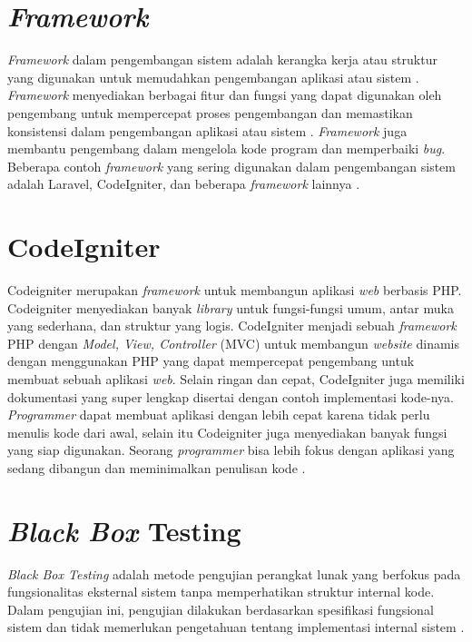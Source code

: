 \section{\textit{Framework}}
\textit{Framework} dalam pengembangan sistem adalah kerangka kerja atau struktur yang digunakan untuk memudahkan pengembangan aplikasi atau sistem \cite{sallaby2020perancangan}. \textit{Framework} menyediakan berbagai fitur dan fungsi yang dapat digunakan oleh pengembang untuk mempercepat proses pengembangan dan memastikan konsistensi dalam pengembangan aplikasi atau sistem \cite{simanullang2021sistem}. \textit{Framework} juga membantu pengembang dalam mengelola kode program dan memperbaiki \textit{bug}. Beberapa contoh \textit{framework} yang sering digunakan dalam pengembangan sistem adalah Laravel, CodeIgniter, dan beberapa \textit{framework} lainnya \cite{Fadllullah2022PengembanganSI}.

\section{CodeIgniter}
Codeigniter merupakan \textit{framework} untuk membangun aplikasi \textit{web} berbasis PHP. Codeigniter menyediakan banyak \textit{library} untuk fungsi-fungsi umum, antar muka yang sederhana, dan struktur yang logis. CodeIgniter menjadi sebuah \textit{framework} PHP dengan \textit{Model, View, Controller} (MVC) untuk membangun \textit{website} dinamis dengan menggunakan PHP yang dapat mempercepat pengembang untuk membuat sebuah aplikasi \textit{web}. Selain ringan dan cepat, CodeIgniter juga memiliki dokumentasi yang super lengkap disertai dengan contoh implementasi kode-nya. \textit{Programmer} dapat membuat aplikasi dengan lebih cepat karena tidak perlu menulis kode dari awal, selain itu Codeigniter juga menyediakan banyak fungsi yang siap digunakan. Seorang \textit{programmer} bisa lebih fokus dengan aplikasi yang sedang dibangun dan meminimalkan penulisan kode \cite{tyowati2017implementasi}.


\section{\textit{Black Box} Testing}
\textit{Black Box Testing} adalah metode pengujian perangkat lunak yang berfokus pada fungsionalitas eksternal sistem tanpa memperhatikan struktur internal kode. Dalam pengujian ini, pengujian dilakukan berdasarkan spesifikasi fungsional sistem dan tidak memerlukan pengetahuan tentang implementasi internal sistem \cite{ahsyar2021sistem}.

